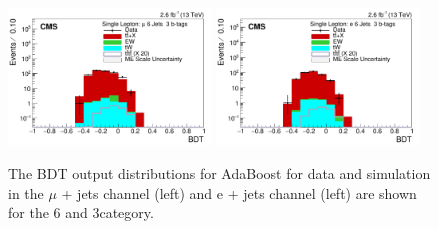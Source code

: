 \begin{figure}[ht!]
    \includegraphics[width=0.48\textwidth]{images/Run2/BDT_Mu29Aug400trees_5MinNodeSize_20nCuts_3MaxDepth_5adaboostbeta_adaBoost_alphaSTune_noMinEvents6nJets3nMtags_StackLogY.pdf}
    \includegraphics[width=0.48\textwidth]{images/Run2/BDT_El29Aug400trees_5MinNodeSize_20nCuts_3MaxDepth_5adaboostbeta_adaBoost_alphaSTune_noMinEvents6nJets3nMtags_StackLogY.pdf} 
    \caption{The BDT output distributions for AdaBoost for data and simulation in the $\mu$ + jets channel (left) and e + jets channel (left) are shown for the 6 \njets and 3\nMtags category.}
    \label{fig:BDT_Mu29Aug400trees_5MinNodeSize_20nCuts_3MaxDepth_5adaboostbeta_adaBoost_alphaSTune_noMinEvents63}
\end{figure}

